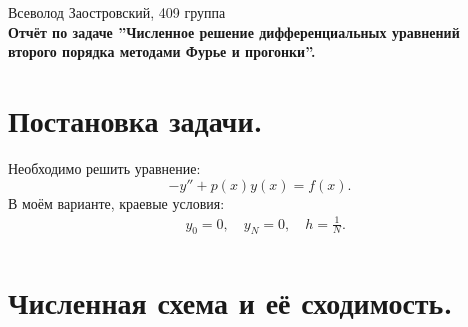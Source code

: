\documentclass[14pt,a4paper]{extarticle}
\newcommand{\1}{\mathbbm{1}}
\begin{document}
\begin{center}

    {Всеволод Заостровский, 409 группа}\\
    {\bfseries Отчёт по задаче ''Численное решение дифференциальных уравнений второго порядка методами Фурье и прогонки''.\\}
    \vspace{1cm}

\end{center}

\section{Постановка задачи.} Необходимо решить уравнение:
\begin{equation} \label{diffeq1}
    -y'' + p(x) y(x) = f(x).
\end{equation}
В моём варианте, краевые условия:
\begin{align} \label{diffeqedge}
    & y_0 = 0, \quad y_N = 0, \quad h = \frac{1}{N}. \\
\end{align}

\section{Численная схема и её сходимость.}
\end{document}
